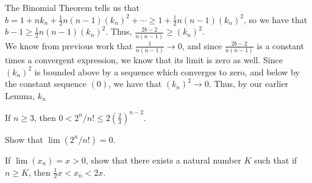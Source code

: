 \documentclass[paper=a4, fontsize=11pt]{scrartcl} %
\numberwithin{equation}{section} %
\numberwithin{figure}{section} %
\numberwithin{table}{section} %
\begin{document}
The Binomial Theorem tells us that $b = 1 + n k_n + \frac{1}{2} n (n-1) (k_n)^2 + \cdots \geq 1 + \frac{1}{2} n (n-1) (k_n)^2$, so we have that $b - 1 \geq \frac{1}{2} n (n-1) (k_n)^2$. Thus, $\frac{2b - 2}{n(n-1)} \geq (k_n)^2$.\\

We know from previous work that $\frac{1}{n(n-1)} \rightarrow 0$, and since $\frac{2b - 2}{n(n-1)}$ is a constant times a convergent expression, we know that its limit is zero as well. Since $(k_n)^2$ is bounded above by a sequence which converges to zero, and below by the constant sequence $(0)$, we have that $(k_n)^2 \rightarrow 0$. Thus, by our earlier Lemma, $k_n$	

 If $n \geq 3$, then $0 < 2^n/n! \leq 2(\frac{2}{3})^{n-2}$.

\pf

 Show that $\lim(2^n/n!) = 0$.

\pf

 If $\lim(x_n) = x > 0$, show that there exists a natural number $K$ such that if $n \geq K$, then $\frac{1}{2}x < x_n < 2x$.
\pf
\end{document}
